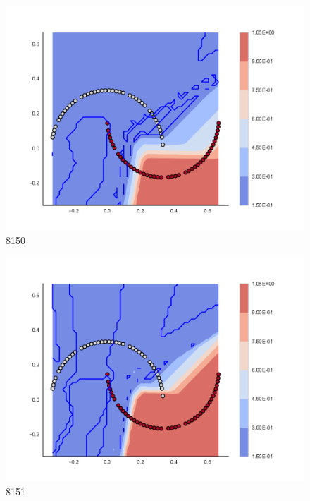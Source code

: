 \begin{subfigure}[b]{0.09\textwidth}
    \includegraphics[clip, trim=2.35cm 1.75cm 4.5cm 0cm,width=\textwidth]{img/convergence/8150.pdf}
    \caption{8150}
    \label{fig:convergence_8150}
\end{subfigure}
%
\begin{subfigure}[b]{0.09\textwidth}
    \includegraphics[clip, trim=2.35cm 1.75cm 4.5cm 0cm,width=\textwidth]{img/convergence/8151.pdf}
    \caption{8151}
    \label{fig:convergence_8151}
\end{subfigure}
%
